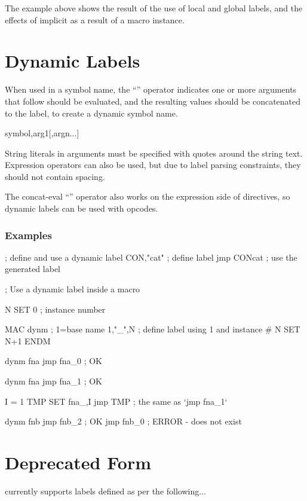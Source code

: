 The example above shows the result of the use of local and global labels, and the effects of implicit  as a result of a macro instance.

\section{Dynamic Labels}
\label{todo}

When used in a symbol name, the ``\mono{,}'' operator indicates one or more
arguments that follow should be evaluated, and the resulting values 
should be concatenated to the label, to create a dynamic symbol name. 

\begin{usage}
symbol,arg1[,argn...]
\end{usage}

String literals in arguments must be specified with quotes around the string
text.  Expression operators can also be used, but due to label
parsing constraints, they should not contain spacing.

The concat-eval ``\mono{,}'' operator also works on the expression side
of  directives, so dynamic labels can be used with opcodes. 

\subsubsection{Examples}

\begin{code}
; define and use a dynamic label
CON,"cat"               ; define label
        jmp CONcat      ; use the generated label
\end{code}

\begin{code}
; Use a dynamic label inside a macro

N SET 0         ; instance number

  MAC dynm      ; {1}=base name
{1},"_",N       ; define label using {1} and instance #
N SET N+1
  ENDM

  dynm fna
  jmp fna_0     ; OK

  dynm fna
  jmp fna_1     ; OK

I = 1
TMP SET fna_,I 
  jmp TMP       ; the same as `jmp fna_1`

  dynm fnb
  jmp fnb_2     ; OK
  jmp fnb_0     ; ERROR - does not exist
\end{code}

\section{Deprecated Form}
\label{changelog:20200907deprecated}
\dasm currently supports labels defined as per the following...

